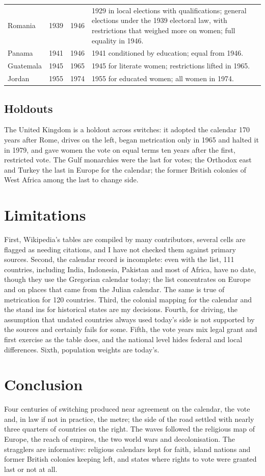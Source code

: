 \documentclass[11pt,a4paper]{article}
\begin{document}
\begin{table}[tbp]
\begin{tabular}{lrrp{9.6cm}}
Romania & 1939 & 1946 & 1929 in local elections with qualifications; general elections under the 1939 electoral law, with restrictions that weighed more on women; full equality in 1946.\\
Panama & 1941 & 1946 & 1941 conditioned by education; equal from 1946.\\
Guatemala & 1945 & 1965 & 1945 for literate women; restrictions lifted in 1965.\\
Jordan & 1955 & 1974 & 1955 for educated women; all women in 1974.\\
\bottomrule\end{tabular}\end{table}

\subsection{Holdouts}
The United Kingdom is a holdout across switches: it adopted the calendar 170 years after Rome, drives on the left, began metrication only in 1965 and halted it in 1979, and gave women the vote on equal terms ten years after the first, restricted vote. The Gulf monarchies were the last for votes; the Orthodox east and Turkey the last in Europe for the calendar; the former British colonies of West Africa among the last to change side.

\section{Limitations}
First, Wikipedia's tables are compiled by many contributors, several cells are flagged as needing citations, and I have not checked them against primary sources. Second, the calendar record is incomplete: even with the list, 111 countries, including India, Indonesia, Pakistan and most of Africa, have no date, though they use the Gregorian calendar today; the list concentrates on Europe and on places that came from the Julian calendar. The same is true of metrication for 120 countries. Third, the colonial mapping for the calendar and the stand ins for historical states are my decisions. Fourth, for driving, the assumption that undated countries always used today's side is not supported by the sources and certainly fails for some. Fifth, the vote years mix legal grant and first exercise as the table does, and the national level hides federal and local differences. Sixth, population weights are today's.

\section{Conclusion}
Four centuries of switching produced near agreement on the calendar, the vote and, in law if not in practice, the metre; the side of the road settled with nearly three quarters of countries on the right. The waves followed the religious map of Europe, the reach of empires, the two world wars and decolonisation. The stragglers are informative: religious calendars kept for faith, island nations and former British colonies keeping left, and states where rights to vote were granted last or not at all.
\end{document}
